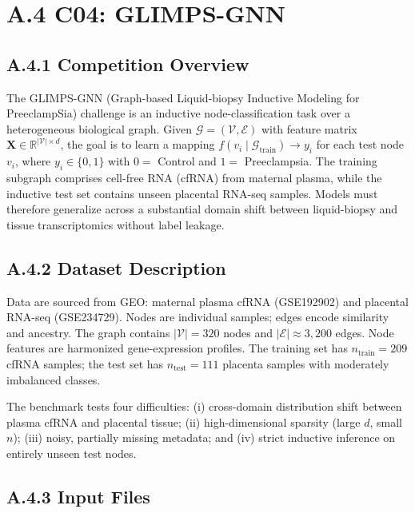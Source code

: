 \documentclass[11pt,a4paper]{article}
\begin{document}
\section*{A.4 C04: GLIMPS-GNN}

\subsection*{A.4.1 Competition Overview}

The GLIMPS-GNN (Graph-based Liquid-biopsy Inductive Modeling for PreeclampSia) challenge is an inductive node-classification task over a heterogeneous biological graph. Given $\mathcal{G} = (\mathcal{V}, \mathcal{E})$ with feature matrix $\mathbf{X} \in \mathbb{R}^{|\mathcal{V}| \times d}$, the goal is to learn a mapping $f(v_i \mid \mathcal{G}_{\text{train}}) \rightarrow y_i$ for each test node $v_i$, where $y_i \in \{0,1\}$ with $0=$ Control and $1=$ Preeclampsia. The training subgraph comprises cell-free RNA (cfRNA) from maternal plasma, while the inductive test set contains unseen placental RNA-seq samples. Models must therefore generalize across a substantial domain shift between liquid-biopsy and tissue transcriptomics without label leakage.

\subsection*{A.4.2 Dataset Description}

Data are sourced from GEO: maternal plasma cfRNA (GSE192902) and placental RNA-seq (GSE234729). Nodes are individual samples; edges encode similarity and ancestry. The graph contains $|\mathcal{V}| = 320$ nodes and $|\mathcal{E}| \approx 3{,}200$ edges. Node features are harmonized gene-expression profiles. The training set has $n_{\text{train}} = 209$ cfRNA samples; the test set has $n_{\text{test}} = 111$ placenta samples with moderately imbalanced classes.

The benchmark tests four difficulties: (i) cross-domain distribution shift between plasma cfRNA and placental tissue; (ii) high-dimensional sparsity (large $d$, small $n$); (iii) noisy, partially missing metadata; and (iv) strict inductive inference on entirely unseen test nodes.

\subsection*{A.4.3 Input Files}
\end{document}
